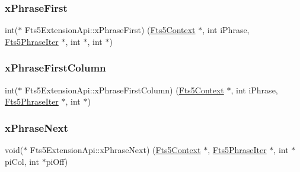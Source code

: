 \mbox{\label{struct_fts5_extension_api_ae2584a3afa2a70504847600e609d43ad}} 
\subsubsection{\texorpdfstring{xPhraseFirst}{xPhraseFirst}}
{\footnotesize\ttfamily int($\ast$ Fts5\+Extension\+Api\+::x\+Phrase\+First) (\mbox{\hyperlink{sqlite3_8h_a97821b95ebebd43db901977ffd5b26bc}{Fts5\+Context}} $\ast$, int i\+Phrase, \mbox{\hyperlink{struct_fts5_phrase_iter}{Fts5\+Phrase\+Iter}} $\ast$, int $\ast$, int $\ast$)}

\mbox{\label{struct_fts5_extension_api_ac57daf9650e3f0c25432bbe348bc124f}} 
\subsubsection{\texorpdfstring{xPhraseFirstColumn}{xPhraseFirstColumn}}
{\footnotesize\ttfamily int($\ast$ Fts5\+Extension\+Api\+::x\+Phrase\+First\+Column) (\mbox{\hyperlink{sqlite3_8h_a97821b95ebebd43db901977ffd5b26bc}{Fts5\+Context}} $\ast$, int i\+Phrase, \mbox{\hyperlink{struct_fts5_phrase_iter}{Fts5\+Phrase\+Iter}} $\ast$, int $\ast$)}

\mbox{\label{struct_fts5_extension_api_ac46faf7ccccf6a02454069b296dc1877}} 
\subsubsection{\texorpdfstring{xPhraseNext}{xPhraseNext}}
{\footnotesize\ttfamily void($\ast$ Fts5\+Extension\+Api\+::x\+Phrase\+Next) (\mbox{\hyperlink{sqlite3_8h_a97821b95ebebd43db901977ffd5b26bc}{Fts5\+Context}} $\ast$, \mbox{\hyperlink{struct_fts5_phrase_iter}{Fts5\+Phrase\+Iter}} $\ast$, int $\ast$pi\+Col, int $\ast$pi\+Off)}

\mbox{\label{struct_fts5_extension_api_ae699a91c958cbac92a2ae8000670ef89}} 
